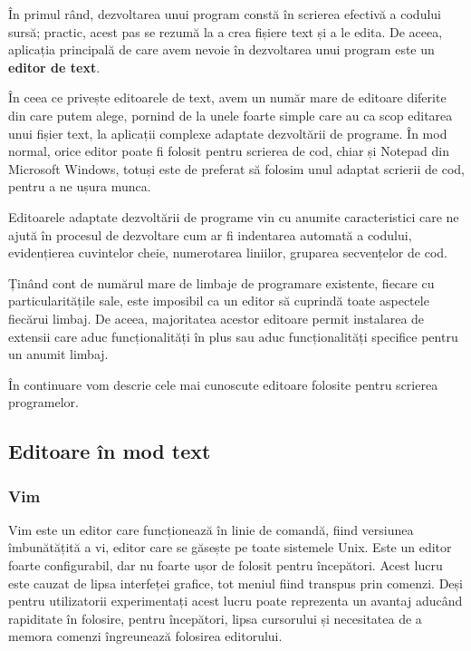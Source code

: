 În primul rând, dezvoltarea unui program constă în scrierea efectivă a codului
sursă; practic, acest pas se rezumă la a crea fișiere text și a le edita. De
aceea, aplicația principală de care avem nevoie în dezvoltarea unui program este
un \textbf{editor de text}.

În ceea ce privește editoarele de text, avem un număr mare de editoare diferite
din care putem alege, pornind de la unele foarte simple care au ca scop editarea
unui fișier text, la aplicații complexe adaptate dezvoltării de programe. În mod
normal, orice editor poate fi folosit pentru scrierea de cod, chiar și Notepad
din Microsoft Windows, totuși este de preferat să folosim unul adaptat scrierii
de cod, pentru a ne ușura munca.

Editoarele adaptate dezvoltării de programe vin cu anumite caracteristici care
ne ajută în procesul de dezvoltare cum ar fi indentarea automată a codului, evidențierea cuvintelor cheie, numerotarea liniilor, gruparea secvențelor de cod.

Ținând cont de numărul mare de limbaje de programare existente, fiecare cu
particularitățile sale, este imposibil ca un editor să cuprindă toate aspectele
fiecărui limbaj. De aceea, majoritatea acestor editoare permit instalarea de
extensii care aduc funcționalități în plus sau aduc funcționalități specifice
pentru un anumit limbaj.

În continuare vom descrie cele mai cunoscute editoare folosite pentru scrierea
programelor.

\subsection{Editoare în mod text}
\label{sec:appdev:dev-stages:editor}

\subsubsection{Vim}
\label{sec:appdev:dev-stages:editor:vim}

Vim este un editor care funcționează în linie de comandă, fiind versiunea
îmbunătățită a vi, editor care se găsește pe toate sistemele Unix. Este un editor foarte configurabil, dar nu foarte ușor de
folosit pentru începători. Acest lucru este cauzat de lipsa interfeței grafice,
tot meniul fiind transpus prin comenzi. Deși pentru utilizatorii experimentați
acest lucru poate reprezenta un avantaj aducând rapiditate în folosire, pentru
începători, lipsa cursorului și necesitatea de a memora comenzi îngreunează
folosirea editorului.

